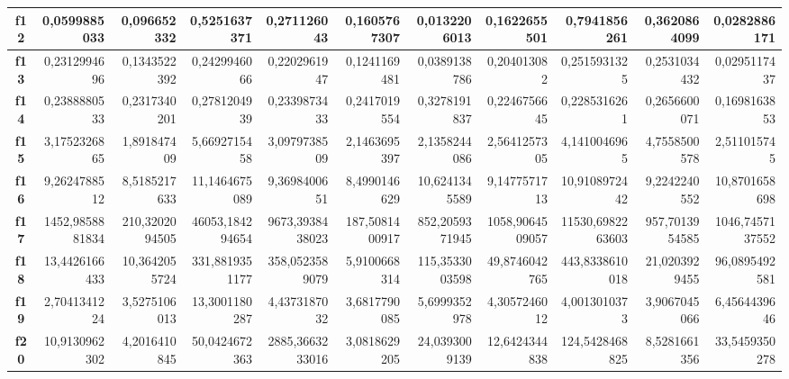 \documentclass[a4paper,11pt]{article}
\begin{document}
\begin{table}[H]
\begin{adjustbox}{width=1.15\textwidth}
\begin{tabular}{|c|r|r|r|r|r|r|r|r|r|r|}
  \textbf{f12} & 0,0599885033 & 0,096652332 & 0,5251637371 & 0,271126043 & 0,1605767307 & 0,0132206013 & 0,1622655501 & 0,7941856261 & 0,3620864099 & 0,0282886171 \\ \hline
  \textbf{f13} & 0,2312994696 & 0,1343522392 & 0,2429946066 & 0,2202961947 & 0,1241169481 & 0,0389138786 & 0,204013082 & 0,2515931325 & 0,2531034432 & 0,0295117437 \\ \hline
  \textbf{f14} & 0,2388880533 & 0,2317340201 & 0,2781204939 & 0,2339873433 & 0,2417019554 & 0,3278191837 & 0,2246756645 & 0,2285316261 & 0,2656600071 & 0,1698163853 \\ \hline
  \textbf{f15} & 3,1752326865 & 1,891847409 & 5,6692715458 & 3,0979738509 & 2,1463695397 & 2,1358244086 & 2,5641257305 & 4,1410046965 & 4,7558500578 & 2,511015745 \\ \hline
  \textbf{f16} & 9,2624788512 & 8,5185217633 & 11,1464675089 & 9,3698400651 & 8,4990146629 & 10,6241345589 & 9,1477571713 & 10,9108972442 & 9,2242240552 & 10,8701658698 \\ \hline
  \textbf{f17} & 1452,9858881834 & 210,3202094505 & 46053,184294654 & 9673,3938438023 & 187,5081400917 & 852,2059371945 & 1058,9064509057 & 11530,6982263603 & 957,7013954585 & 1046,7457137552 \\ \hline
  \textbf{f18} & 13,4426166433 & 10,3642055724 & 331,8819351177 & 358,0523589079 & 5,9100668314 & 115,3533003598 & 49,8746042765 & 443,8338610018 & 21,0203929455 & 96,0895492581 \\ \hline
  \textbf{f19} & 2,7041341224 & 3,5275106013 & 13,3001180287 & 4,4373187032 & 3,6817790085 & 5,6999352978 & 4,3057246012 & 4,0013010373 & 3,9067045066 & 6,4564439646 \\ \hline
  \textbf{f20} & 10,9130962302 & 4,2016410845 & 50,0424672363 & 2885,3663233016 & 3,0818629205 & 24,0393009139 & 12,6424344838 & 124,5428468825 & 8,5281661356 & 33,5459350278 \\ \hline
  \end{tabular}
  \end{adjustbox}
  \label{allresults30}
  \end{table}
  
\end{document}
